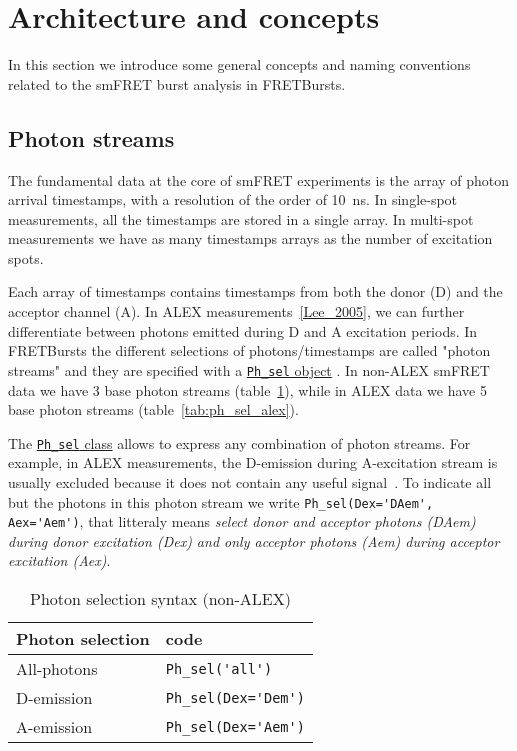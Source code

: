 \section{Architecture and concepts}
\label{sec:concepts}

In this section we introduce some general concepts and naming conventions related 
to the smFRET burst analysis in FRETBursts.

\subsection{Photon streams}
\label{sec:ph_streams}

The fundamental data at the core of smFRET experiments is the array of photon
arrival timestamps, with a resolution of the order of 10~ns. In single-spot
measurements, all the timestamps are stored in a single array. In multi-spot
measurements we have as many timestamps arrays as the number of excitation
spots.

Each array of timestamps contains timestamps from both the donor (D) and the
acceptor channel (A). In ALEX measurements~\ref{Lee_2005}, we can further 
differentiate between
photons emitted during D and A excitation periods. In FRETBursts the different
selections of photons/timestamps are called "photon streams" and they are
specified with a
\href{http://fretbursts.readthedocs.org/en/latest/ph_sel.html}{\texttt{Ph\_sel}
object} . In non-ALEX smFRET data we have 3 base photon streams
(table~\ref{tab:ph_sel_smfret}), while in ALEX data we have 5 base photon
streams (table~\ref{tab:ph_sel_alex}).

The
\href{http://fretbursts.readthedocs.org/en/latest/ph_sel.html}{\texttt{Ph\_sel}
class} allows to express any combination of photon streams. 
For example, in ALEX measurements, the D-emission during A-excitation stream is
usually excluded because it does not contain any useful signal~\cite{Lee_2005}.
To indicate all but the photons in this photon stream we write
\verb|Ph_sel(Dex='DAem', Aex='Aem')|, that litteraly means \textit{select donor
and acceptor photons (DAem) during donor excitation (Dex) and only acceptor
photons (Aem) during acceptor excitation (Aex)}.

\begin{table}
\begin{tabular}{l|l}
  Photon selection  & code \\
  \hline
  All-photons       & \verb|Ph_sel('all')|\\
  D-emission    & \verb|Ph_sel(Dex='Dem')|\\
  A-emission & \verb|Ph_sel(Dex='Aem')|\\
\end{tabular}
\caption{\label{tab:ph_sel_smfret}Photon selection syntax (non-ALEX)}
\end{table}

